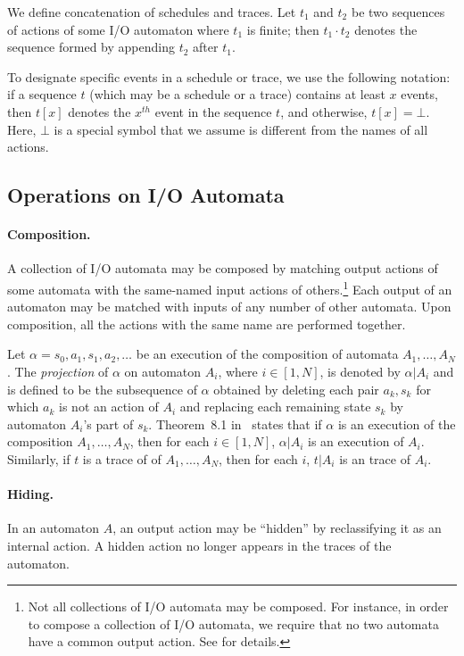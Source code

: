 \documentclass[11pt]{article}
\numberwithin{theorem}{section}
\begin{document}
We define concatenation of schedules and traces. 
Let $t_1$ and $t_2$ be two sequences of actions of some I/O automaton
where $t_1$ is finite; then $t_1 \cdot t_2$ denotes the sequence
formed by appending $t_2$ after $t_1$.

To designate specific events in a schedule or trace, we use the
following notation:
if a sequence $t$ (which may be a schedule or a trace) contains at
least $x$ events, then $t[x]$ denotes the $x^{th}$ event in the
sequence $t$, and otherwise, $t[x] = \bot$. 
Here, $\bot$ is a special symbol that we assume is different from the
names of all actions. 

\subsection{Operations on I/O Automata}

\paragraph{Composition.} 
A collection of I/O automata may be composed by matching output
actions of some automata with the same-named input actions of
others.\footnote{Not all collections of I/O automata may be
  composed. For instance, in order to compose a collection of I/O
  automata, we require that no two automata have a common output
  action.  See \cite[chapter 8]{lync:da} for details.}
Each output of an automaton may be matched with inputs of any number
of other automata. 
Upon composition, all the actions with the same name are performed
together.

Let $\alpha = s_0,a_1,s_1,a_2,\ldots$ be an execution of the
composition of automata $A_1, \dots, A_N$. 
The \emph{projection} of $\alpha$ on automaton $A_i$, where $i \in
[1,N]$, is denoted by $\alpha|A_i$ and is defined to be the
subsequence of $\alpha$ obtained by deleting each pair $a_k,s_k$
for which $a_k$ is not an action of $A_i$ and replacing each remaining
state $s_k$ by automaton $A_i$'s part of $s_k$. 
Theorem~8.1 in~\cite{lync:da} states that if $\alpha$ is an execution
of the composition $A_1, \dots, A_N$, then for each $i \in [1,N]$,
$\alpha|A_i$ is an execution of $A_i$. 
Similarly, if $t$ is a trace of of $A_1,\dots, A_N$, then for
each $i$, $t|A_i$ is an trace of $A_i$.



\paragraph{Hiding.} 
In an automaton $A$, an output action may be ``hidden'' by
reclassifying it as an internal action. 
A hidden action no longer appears in the traces of the automaton.
\end{document}

